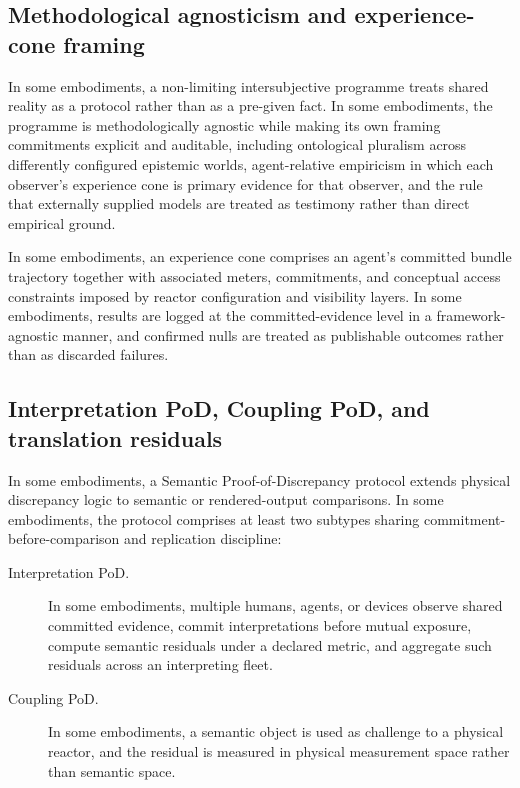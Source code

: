 \documentclass[a4paper,12pt]{article}
\begin{document}
\subsection{Methodological agnosticism and experience-cone framing}


In some embodiments, a non-limiting intersubjective programme treats
shared reality as a protocol rather than as a pre-given fact. In some
embodiments, the programme is methodologically agnostic while making
its own framing commitments explicit and auditable, including
ontological pluralism across differently configured epistemic worlds,
agent-relative empiricism in which each observer's experience cone is
primary evidence for that observer, and the rule that externally
supplied models are treated as testimony rather than direct empirical
ground.

In some embodiments, an experience cone comprises an agent's committed
bundle trajectory together with associated meters, commitments, and
conceptual access constraints imposed by reactor configuration and
visibility layers. In some embodiments, results are logged at the
committed-evidence level in a framework-agnostic manner, and confirmed
nulls are treated as publishable outcomes rather than as discarded
failures.

\subsection{Interpretation PoD, Coupling PoD, and translation
  residuals}


In some embodiments, a Semantic Proof-of-Discrepancy protocol extends
physical discrepancy logic to semantic or rendered-output comparisons.
In some embodiments, the protocol comprises at least two subtypes
sharing commitment-before-comparison and replication discipline:

\begin{description}
  \item[Interpretation PoD.] In some embodiments, multiple humans,
    agents, or devices observe shared committed evidence, commit
    interpretations before mutual exposure, compute semantic residuals
    under a declared metric, and aggregate such residuals across an
    interpreting fleet.
  \item[Coupling PoD.] In some embodiments, a semantic object is used
    as challenge to a physical reactor, and the residual is measured
    in physical measurement space rather than semantic space.
\end{description}
\end{document}
